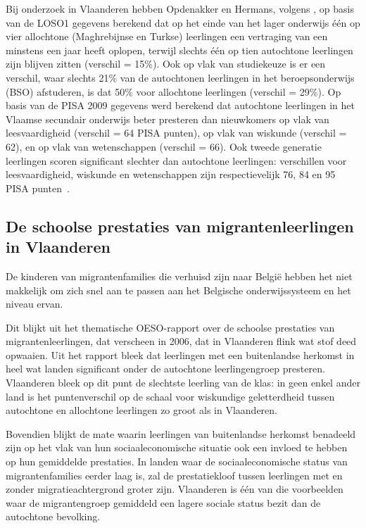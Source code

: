\documentclass{hogent-article}
\begin{document}
Bij onderzoek in Vlaanderen hebben Opdenakker en Hermans, volgens \textcite{Agirdag2014}, op basis van de LOSO1 gegevens berekend dat op het einde van het lager onderwijs \'e\'en op vier allochtone (Maghrebijnse en Turkse) leerlingen een vertraging van een minstens een jaar heeft oplopen, terwijl slechts \'e\'en op tien autochtone leerlingen zijn blijven zitten (verschil = 15\%). Ook op vlak van studiekeuze is er een verschil, waar slechts 21\% van de autochtonen leerlingen in het beroepsonderwijs (BSO) afstuderen, is dat 50\% voor allochtone leerlingen (verschil = 29\%). Op basis van de PISA 2009 gegevens werd berekend dat autochtone leerlingen in het Vlaamse secundair onderwijs beter presteren dan nieuwkomers op vlak van leesvaardigheid (verschil = 64 PISA punten), op vlak van wiskunde (verschil = 62), en op vlak van wetenschappen (verschil = 66). Ook tweede generatie leerlingen scoren significant slechter dan autochtone leerlingen: verschillen voor leesvaardigheid, wiskunde en wetenschappen zijn respectievelijk 76, 84 en 95 PISA punten~\autocite{Agirdag2014}.

\subsection*{De schoolse prestaties van migrantenleerlingen in Vlaanderen}

De kinderen van migrantenfamilies die verhuisd zijn naar Belgi\"e hebben het niet makkelijk om zich snel aan te passen aan het Belgische onderwijssysteem en het niveau ervan.

Dit blijkt uit het thematische OESO-rapport over de schoolse prestaties van migrantenleerlingen, dat verscheen in 2006, dat in Vlaanderen flink wat stof deed opwaaien. Uit het rapport bleek dat leerlingen met een buitenlandse herkomst in heel wat landen significant onder de autochtone leerlingengroep presteren. Vlaanderen bleek op dit punt de slechtste leerling van de klas: in geen enkel ander land is het puntenverschil op de schaal voor wiskundige geletterdheid tussen autochtone en allochtone leerlingen zo groot als in Vlaanderen.

Bovendien blijkt de mate waarin leerlingen van buitenlandse herkomst benadeeld zijn op het vlak van hun sociaaleconomische situatie ook een invloed te hebben op hun gemiddelde prestaties. In landen waar de sociaaleconomische status van migrantenfamilies eerder laag is, zal de prestatiekloof tussen leerlingen met en zonder migratieachtergrond groter zijn. Vlaanderen is \'e\'en van die voorbeelden waar de migrantengroep gemiddeld een lagere sociale status bezit dan de autochtone bevolking.
\end{document}

